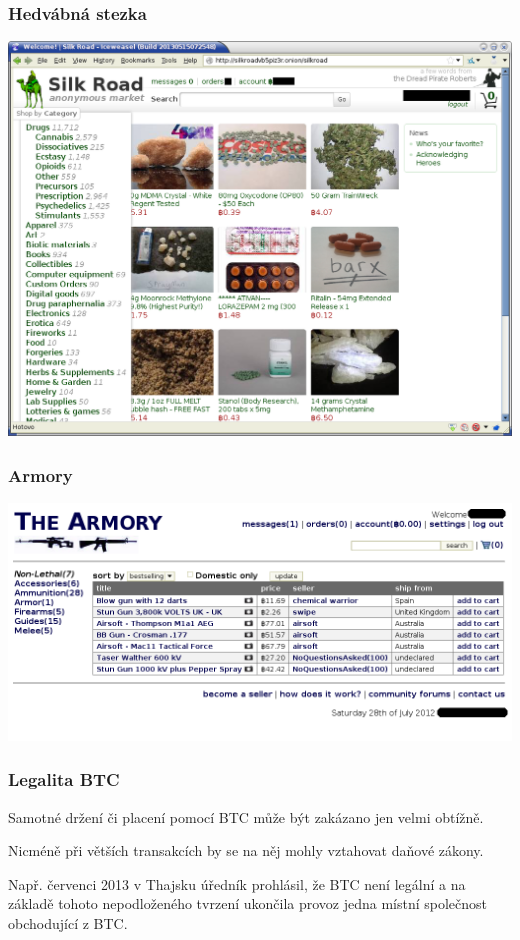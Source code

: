 \documentclass[xetex]{beamer}
\begin{document}
\begin{frame}
	\frametitle{Hedvábná stezka}
	\includegraphics[scale=0.4]{images/silkroad.png}
\end{frame}

\begin{frame}
	\frametitle{Armory}
	\includegraphics[scale=0.4]{images/armory.png}
\end{frame}

\begin{frame}
	\frametitle{Legalita BTC}
	Samotné držení či placení pomocí BTC může být zakázano jen velmi obtížně.

	Nicméně při větších transakcích by se na něj mohly vztahovat daňové zákony.

	Např. červenci 2013 v Thajsku úředník prohlásil, že BTC není legální a na základě tohoto nepodloženého tvrzení ukončila provoz jedna místní společnost obchodující z BTC.
\end{frame}
\end{document}
